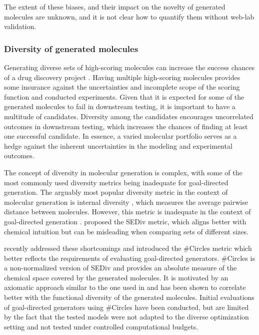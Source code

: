The extent of these biases, and their impact on the novelty of generated molecules are unknown, and it is
not clear how to quantify them without web-lab validation.

\subsubsection{Diversity of generated molecules}
Generating diverse sets of high-scoring molecules can increase the success chances of a drug
discovery project
\citep{martinDiverseViewpointsComputational2001,gorseDiversityMedicinalChemistry2006}. Having
multiple high-scoring molecules provides some insurance against the uncertainties and incomplete
scope of the scoring function and conducted experiments. Given that it is expected for some of
the generated molecules to fail in downstream testing, it is important to have a multitude of
candidates. Diversity among the candidates encourages uncorrelated outcomes in downstream testing, which
increases the chances of finding at least one successful candidate. In essence, a varied molecular
portfolio serves as a hedge against the inherent uncertainties in the modeling and experimental
outcomes.

The concept of diversity in molecular generation is complex, with some of the most commonly used
diversity metrics being inadequate for goal-directed generation. The arguably most popular diversity
metric in the context of molecular generation is internal diversity
\citep{benhendaChemGANChallengeDrug2017}, which measures the average pairwise distance between
molecules. However, this metric is inadequate in the context of goal-directed generation
\citep{waldmanNovelAlgorithmsOptimization2000,xieMARSMarkovMolecular2021,thomasComparisonStructureLigandbased2021}.
\citet{thomasComparisonStructureLigandbased2021} proposed the \ac{SEDiv} metric, which aligns better
with chemical intuition but can be misleading when comparing sets of different sizes.

\citet{xieHowMuchSpace2023} recently addressed these shortcomings and introduced the \#Circles
metric which better reflects the requirements of evaluating goal-directed generators. \#Circles is a
non-normalized version of \ac{SEDiv} and provides an absolute measure of the chemical space covered
by the generated molecules. It is motivated by an axiomatic approach similar to the one used in
\citep{waldmanNovelAlgorithmsOptimization2000} and has been shown to correlate better with the
functional diversity of the generated molecules. Initial evaluations of goal-directed
generators using \#Circles have been conducted, but are limited by the fact
that the tested models were not adapted to the diverse optimization setting and not
tested under controlled computational budgets.

